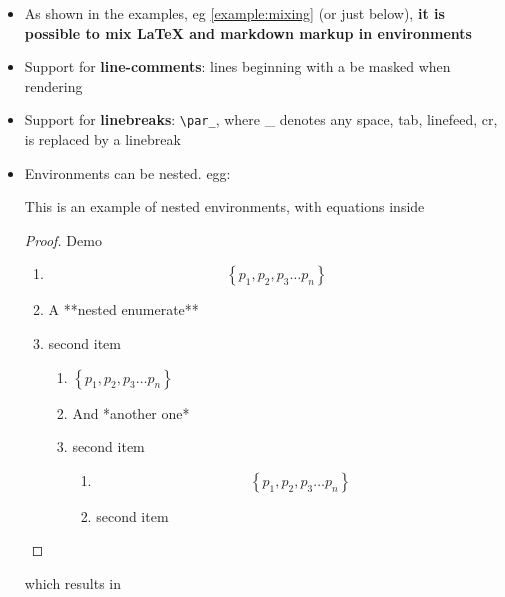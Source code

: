     \begin{itemize}
\item
  As shown in the examples, eg \ref{example:mixing} (or just below),
  \textbf{it is possible to mix LaTeX and markdown markup in
  environments}
\item
  Support for \textbf{line-comments}: lines beginning with a %
  be masked when rendering
\item
  Support for \textbf{linebreaks}: \texttt{\textbackslash{}par\_}, where
  \_ denotes any space, tab, linefeed, cr, is replaced by a linebreak
\item
  Environments can be nested. egg:

  \begin{listing}
  This is an example of nested environments, with equations inside\\
  \begin{proof} Demo
  \begin{enumerate}
  \item $$ \left\{ p_1, p_2, p_3 \ldots p_n \right\} $$
  \item A **nested enumerate**
  \item second item 
  \begin{enumerate}
  \item $ \left\{ p_1, p_2, p_3 \ldots p_n \right\} $
  \item And *another one*
  \item second item 
  \begin{enumerate}
  \item $$ \left\{ p_1, p_2, p_3 \ldots p_n \right\} $$
  \item second item 
  \end{enumerate}
  \end{enumerate}
  \end{enumerate}
  \end{proof}
  \end{listing}

  which results in
\end{itemize}

